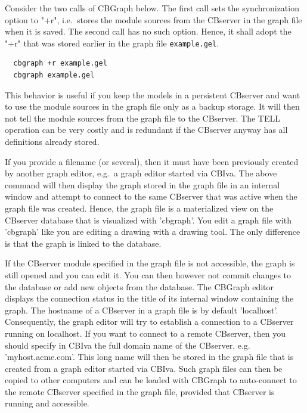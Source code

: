 Consider the two calls of CBGraph below. The first call sets the synchronization option to "+r", i.e.\
stores the module sources from the CBserver in the graph file when it is saved. 
The second call has no such option. Hence, it shall adopt the "+r" that was stored earlier in the graph file
{\tt example.gel}.



{\small
\begin{verbatim}
  cbgraph +r example.gel
  cbgraph example.gel
\end{verbatim}
}

This behavior is useful if you keep the models in a persistent CBserver and want to use the module sources in
the graph file only as a backup storage. It will then not tell the module sources from the graph file to the CBserver.
The TELL operation can be very costly and is redundant if the CBserver anyway has all definitions already stored.



If you provide a filename (or several), then it must have been previously created
by another graph editor, e.g.\ a graph editor started via CBIva.
The above command will then display the graph stored 
in the graph file in an internal window and attempt to connect to the same
CBserver that was active when the graph file
was created. Hence, the graph file is a materialized view on the CBserver database that is 
visualized with 'cbgraph'. You edit a graph file with 'cbgraph' like you are editing a drawing
with a drawing tool. The only difference is that the graph is linked to the database.

If the CBserver module specified in the graph file is not accessible, the graph is still opened
and you can edit it. You can then however not commit changes to the database or add new
objects from the database. The CBGraph editor displays the connection status in the title
of its internal window containing the graph.
The hostname of a CBserver in a graph file is by default 'localhost'. Consequently, the graph
editor will try to establish a connection to a CBserver running on localhost. If you want to connect
to a remote CBserver, then you should specify in CBIva the full domain name of the CBserver,
e.g. 'myhost.acme.com'. This long name will then be stored in the graph file that is created
from a graph editor started via CBIva. Such graph files can then be copied to other computers
and can be loaded with CBGraph to auto-connect to the remote CBserver specified in the graph file,
provided that CBserver is running and accessible.

